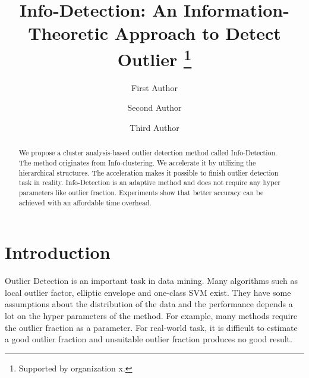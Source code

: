 \documentclass[runningheads]{llncs}
\begin{document}
%
\title{Info-Detection: An Information-Theoretic Approach to Detect Outlier \thanks{Supported by organization x.}}
%
%
\author{First Author \and
Second Author \and
Third Author}
%
%
%
\maketitle              %
%
\begin{abstract}
We propose a cluster analysis-based outlier detection method called Info-Detection. The method originates from Info-clustering. We accelerate it by utilizing the hierarchical structures. The acceleration makes it possible to finish outlier detection task in reality. Info-Detection is an adaptive method and does not require any hyper parameters like outlier fraction. Experiments show that better accuracy can be achieved with an affordable time overhead.

\end{abstract}
%
%
%
\section{Introduction}
Outlier Detection is an important task in data mining. Many algorithms such as local outlier factor, elliptic envelope and one-class SVM exist. They have some assumptions about the distribution of the data and the performance depends a lot on the hyper parameters of the method. For example, many methods require the outlier fraction as a parameter. For real-world task, it is difficult to estimate a good outlier fraction and unsuitable outlier fraction produces no good result. 
\end{document}
